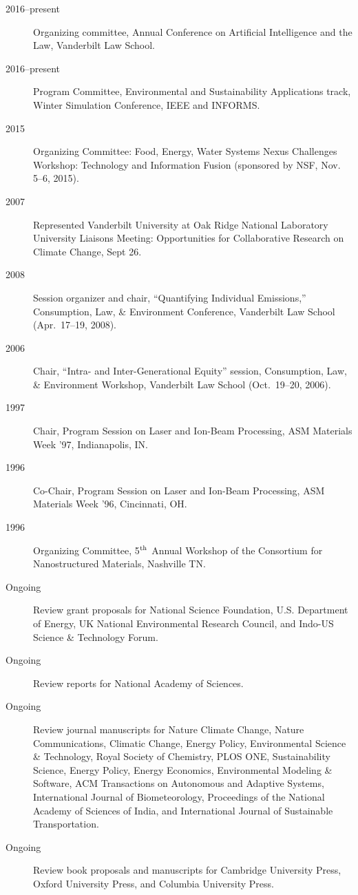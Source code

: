 \documentclass[10pt]{article}
\begin{document}
\begin{description}
            \item[2016--present] Organizing committee, Annual Conference on Artificial Intelligence and the Law, Vanderbilt Law School.
            \item[2016--present] Program Committee, Environmental and Sustainability Applications track, Winter Simulation Conference, IEEE and INFORMS.
            \item[2015] Organizing Committee: Food, Energy, Water Systems Nexus Challenges Workshop: Technology and Information Fusion (sponsored by NSF, Nov. 5--6, 2015).
            \item[2007] Represented Vanderbilt University at Oak Ridge National Laboratory University Liaisons Meeting: Opportunities for Collaborative Research on Climate Change, Sept 26.
            \item[2008] Session organizer and chair, ``Quantifying Individual Emissions,'' Consumption, Law, \& Environment Conference, Vanderbilt Law School (Apr.\ 17--19, 2008).
            \item[2006] Chair, ``Intra- and Inter-Generational Equity'' session, Consumption, Law, \& Environment Workshop, Vanderbilt Law School (Oct.~19--20, 2006).
            \item[1997] Chair, Program Session on Laser and Ion-Beam Processing, ASM Materials Week '97, In\-di\-an\-a\-po\-lis, IN.
            \item[1996] Co-Chair, Program Session on Laser and Ion-Beam Processing, ASM Materials Week '96, Cincinnati, OH.
            \item[1996] Organizing Committee, 5$^{\mbox{\scriptsize th}}$ Annual Workshop of the Consortium for Nanostructured Materials, Nashville TN.
            \item[Ongoing] Review grant proposals for National Science Foundation, U.S. Department of Energy, UK National Environmental Research Council, and Indo-US Science \& Technology Forum.
            \item[Ongoing] Review reports for National Academy of Sciences.
            \item[Ongoing] Review journal manuscripts for 
            Nature Climate Change,
            Nature Communications,
            Climatic Change, 
            Energy Policy, 
            Environmental Science \& Technology,
            Royal Society of Chemistry,
            PLOS ONE,
            Sustainability Science,
            Energy Policy,
            Energy Economics, 
            Environmental Modeling \& Software,
            ACM Transactions on Autonomous and Adaptive Systems,
            International Journal of Biometeorology,
            Proceedings of the National Academy of Sciences of India,
            and
            International Journal of Sustainable Transportation.
            \item[Ongoing] Review book proposals and manuscripts for Cambridge University Press, Oxford University Press, and Columbia University Press.
        \end{description}
\end{document}
